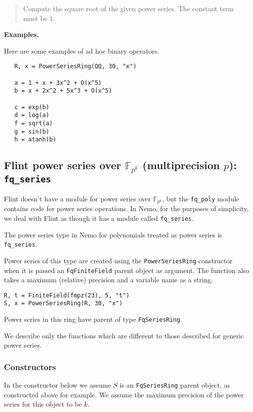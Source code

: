 \documentclass[a4paper,10pt]{article}
\newcommand{\F}{\mathbb{F}}
\newcommand{\code}{\lstinline}
\newcommand{\desc}[1]{\vspace{-3mm}\begin{quote}#1\end{quote}}
\begin{document}
{{\desc{Compute the square root of the given power series. The constant term must be $1$.}

\textbf{Examples.}

Here are some examples of ad hoc binary operators.

\begin{lstlisting}
   R, x = PowerSeriesRing(QQ, 30, "x")

   a = 1 + x + 3x^2 + O(x^5)
   b = x + 2x^2 + 5x^3 + O(x^5)

   c = exp(b)
   d = log(a)
   f = sqrt(a)
   g = sin(b)
   h = atanh(b)   
\end{lstlisting}

\subsection{Flint power series over $\F_{p^k}$ (multiprecision $p$): \code{fq_series}}

Flint doesn't have a module for power series over $\F_{p^k}$, but the \code{fq_poly}
module contains code for power series operations. In Nemo, for the purposes of
simplicity, we deal with Flint as though it has a module called \code{fq_series}.

The power series type in Nemo for polynomials treated as power series is
\code{fq_series}. 

Power series of this type are created using the \code{PowerSeriesRing} constructor when
it is passed an \code{FqFiniteField} parent object as argument. The function also takes a
maximum (relative) precision and a variable name as a string.

\begin{lstlisting}
R, t = FiniteField(fmpz(23), 5, "t")
S, x = PowerSeriesRing(R, 30, "x")
\end{lstlisting}

Power series in this ring have parent of type \code{FqSeriesRing}.

We describe only the functions which are different to those described for generic
power series.

\subsubsection{Constructors}

In the constructor below we assume $S$ is an \code{FqSeriesRing} parent object, as
constructed above for example. We assume the maximum precision of the power series
for this object to be $k$.

}}
\end{document}
